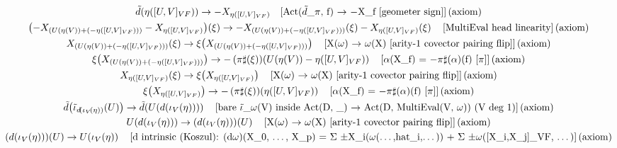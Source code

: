 \documentclass[11pt]{article}
\begin{document}
{\begin{gather*}
\tilde{d}\!\left(\eta\!\left([U,V]_{VF}\right)\right) \to -X_{\eta([U,V]_{VF})} \quad \text{[Act(\ensuremath{\tilde{d}}\_\ensuremath{\pi}, f) \ensuremath{\to} \ensuremath{-}X\_f  [geometer sign]]\,(axiom)} \\
\left(-X_{(U(\eta(V)) + (-\eta([U,V]_{VF})))} - X_{\eta([U,V]_{VF})}\right)\!\left(\xi\right) \to -X_{(U(\eta(V)) + (-\eta([U,V]_{VF})))}\!\left(\xi\right) - X_{\eta([U,V]_{VF})}\!\left(\xi\right) \quad \text{[MultiEval head linearity]\,(axiom)} \\
X_{(U(\eta(V)) + (-\eta([U,V]_{VF})))}\!\left(\xi\right) \to \xi\!\left(X_{(U(\eta(V)) + (-\eta([U,V]_{VF})))}\right) \quad \text{[X(\ensuremath{\omega}) \ensuremath{\to} \ensuremath{\omega}(X)  [arity-1 covector pairing flip]]\,(axiom)} \\
\xi\!\left(X_{(U(\eta(V)) + (-\eta([U,V]_{VF})))}\right) \to -\left(\pi\sharp\!\left(\xi\right)\right)\!\left(U\!\left(\eta\!\left(V\right)\right) - \eta\!\left([U,V]_{VF}\right)\right) \quad \text{[\ensuremath{\alpha}(X\_f) = \ensuremath{-}\ensuremath{\pi}\ensuremath{\sharp}(\ensuremath{\alpha})(f) [\ensuremath{\pi}]]\,(axiom)} \\
X_{\eta([U,V]_{VF})}\!\left(\xi\right) \to \xi\!\left(X_{\eta([U,V]_{VF})}\right) \quad \text{[X(\ensuremath{\omega}) \ensuremath{\to} \ensuremath{\omega}(X)  [arity-1 covector pairing flip]]\,(axiom)} \\
\xi\!\left(X_{\eta([U,V]_{VF})}\right) \to -\left(\pi\sharp\!\left(\xi\right)\right)\!\left(\eta\!\left([U,V]_{VF}\right)\right) \quad \text{[\ensuremath{\alpha}(X\_f) = \ensuremath{-}\ensuremath{\pi}\ensuremath{\sharp}(\ensuremath{\alpha})(f) [\ensuremath{\pi}]]\,(axiom)} \\
\tilde{d}\!\left(\tilde{\iota}_{d\!\left(\iota_V\!\left(\eta\right)\right)}\!\left(U\right)\right) \to \tilde{d}\!\left(U\!\left(d\!\left(\iota_V\!\left(\eta\right)\right)\right)\right) \quad \text{[bare \ensuremath{\tilde{\ensuremath{\iota}}}\_\ensuremath{\omega}(V) inside Act(D, \_) \ensuremath{\to} Act(D, MultiEval(V, \ensuremath{\omega}))  (V deg 1)]\,(axiom)} \\
U\!\left(d\!\left(\iota_V\!\left(\eta\right)\right)\right) \to \left(d\!\left(\iota_V\!\left(\eta\right)\right)\right)\!\left(U\right) \quad \text{[X(\ensuremath{\omega}) \ensuremath{\to} \ensuremath{\omega}(X)  [arity-1 covector pairing flip]]\,(axiom)} \\
\left(d\!\left(\iota_V\!\left(\eta\right)\right)\right)\!\left(U\right) \to U\!\left(\iota_V\!\left(\eta\right)\right) \quad \text{[d intrinsic (Koszul): (d\ensuremath{\omega})(X\_0, \ensuremath{\dots}, X\_p) = \ensuremath{\Sigma} \ensuremath{\pm}X\_i(\ensuremath{\omega}(\ensuremath{\dots},hat\_i,\ensuremath{\dots})) + \ensuremath{\Sigma} \ensuremath{\pm}\ensuremath{\omega}([X\_i,X\_j]\_VF, \ensuremath{\dots})]\,(axiom)} \\

\end{gather*}}
\end{document}
